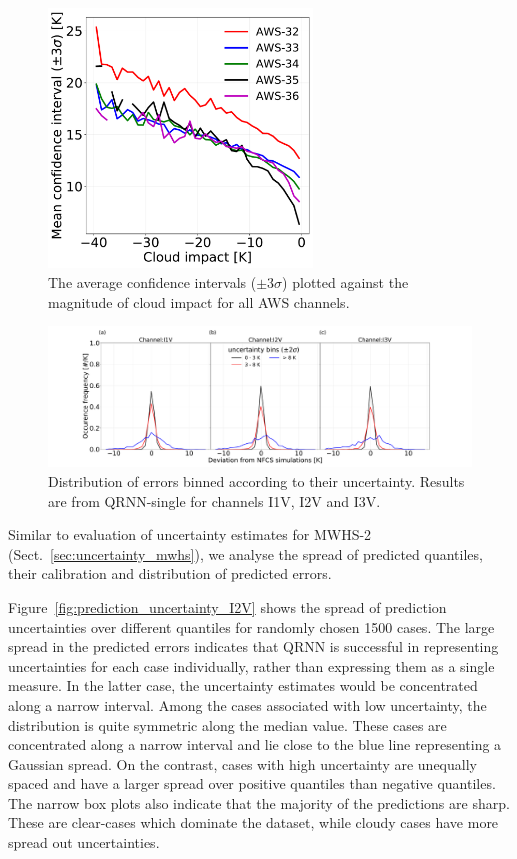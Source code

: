 \documentclass[amt, manuscript]{copernicus}
\begin{document}
\begin{figure}[t]
	\includegraphics[width = 70mm]{Figures/fig12.pdf}	
	\caption{The average confidence intervals ($\pm3\sigma$) plotted against the magnitude of cloud impact for all AWS channels.}
	\label{fig:uncertainty_cloud_impact}	
\end{figure}
\begin{figure}[t]
	\includegraphics[width=\textwidth]{Figures/fig13.pdf}	
	\caption{Distribution of errors binned according to their uncertainty. Results are from QRNN-single for channels I1V, I2V and I3V.}
	\label{fig:error_distribution_uncertainty_bins}	
\end{figure}

Similar to evaluation of uncertainty estimates for MWHS-2 (Sect.~\ref{sec:uncertainty_mwhs}), we analyse the spread of predicted quantiles, their calibration and distribution of predicted errors. 

Figure~\ref{fig:prediction_uncertainty_I2V} shows the spread of prediction uncertainties over different quantiles for randomly chosen 1500 cases. The large spread in the predicted errors indicates that QRNN is successful in representing uncertainties for each case individually, rather than expressing them as a single measure. In the latter case, the uncertainty estimates would be concentrated along a narrow interval. Among the cases associated with low uncertainty, the distribution is quite symmetric along the median value. These cases are concentrated along a narrow interval and lie close to the blue line representing a Gaussian spread. On the contrast, cases with high uncertainty are unequally spaced and have a larger spread over positive quantiles than negative quantiles. The narrow box plots also indicate that the majority of the predictions are sharp. These are clear-cases which dominate the dataset, while cloudy cases have more spread out uncertainties. 
\end{document}
